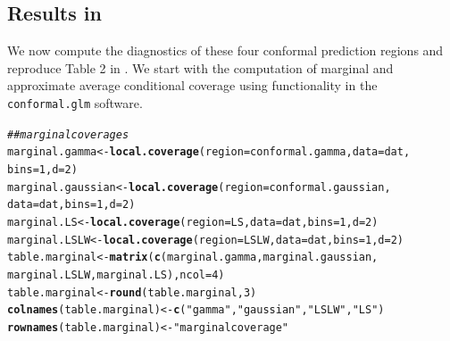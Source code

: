 \documentclass[11pt]{article}\usepackage[]{graphicx}\usepackage[]{color}
\makeatletter
\newcommand{\hlnum}[1]{\textcolor[rgb]{0.686,0.059,0.569}{#1}}%
\newcommand{\hlstr}[1]{\textcolor[rgb]{0.192,0.494,0.8}{#1}}%
\newcommand{\hlcom}[1]{\textcolor[rgb]{0.678,0.584,0.686}{\textit{#1}}}%
\newcommand{\hlstd}[1]{\textcolor[rgb]{0.345,0.345,0.345}{#1}}%
\newcommand{\hlkwb}[1]{\textcolor[rgb]{0.69,0.353,0.396}{#1}}%
\newcommand{\hlkwc}[1]{\textcolor[rgb]{0.333,0.667,0.333}{#1}}%
\newcommand{\hlkwd}[1]{\textcolor[rgb]{0.737,0.353,0.396}{\textbf{#1}}}%
\newenvironment{kframe}{%
 \def\at@end@of@kframe{}%
 \ifinner\ifhmode%
  \def\at@end@of@kframe{\end{minipage}}%
  \begin{minipage}{\columnwidth}%
 \fi\fi%
 \def\FrameCommand##1{\hskip\@totalleftmargin \hskip-\fboxsep
 \colorbox{shadecolor}{##1}\hskip-\fboxsep
     \hskip-\linewidth \hskip-\@totalleftmargin \hskip\columnwidth}%
 \MakeFramed {\advance\hsize-\width
   \@totalleftmargin\z@ \linewidth\hsize
   \@setminipage}}%
 {\par\unskip\endMakeFramed%
 \at@end@of@kframe}
\newenvironment{knitrout}{}{} %
\makeatother
\begin{document}
\subsection{Results in \citet{eck2019conformal}}

We now compute the diagnostics of these four conformal prediction 
regions and reproduce Table 2 in \citet{eck2019conformal}.  
We start with the computation of marginal and approximate average 
conditional coverage using functionality in the \texttt{conformal.glm} 
software.


\begin{knitrout}
\color{fgcolor}\begin{kframe}
\begin{alltt}
\hlcom{## marginal coverages}
\hlstd{marginal.gamma} \hlkwb{<-} \hlkwd{local.coverage}\hlstd{(}\hlkwc{region} \hlstd{= conformal.gamma,} \hlkwc{data} \hlstd{= dat,}
  \hlkwc{bins} \hlstd{=} \hlnum{1}\hlstd{,} \hlkwc{d} \hlstd{=} \hlnum{2}\hlstd{)}
\hlstd{marginal.gaussian} \hlkwb{<-} \hlkwd{local.coverage}\hlstd{(}\hlkwc{region} \hlstd{= conformal.gaussian,}
  \hlkwc{data} \hlstd{= dat,} \hlkwc{bins} \hlstd{=} \hlnum{1}\hlstd{,} \hlkwc{d} \hlstd{=} \hlnum{2}\hlstd{)}
\hlstd{marginal.LS} \hlkwb{<-} \hlkwd{local.coverage}\hlstd{(}\hlkwc{region} \hlstd{= LS,} \hlkwc{data} \hlstd{= dat,} \hlkwc{bins} \hlstd{=} \hlnum{1}\hlstd{,} \hlkwc{d} \hlstd{=} \hlnum{2}\hlstd{)}
\hlstd{marginal.LSLW} \hlkwb{<-} \hlkwd{local.coverage}\hlstd{(}\hlkwc{region} \hlstd{= LSLW,} \hlkwc{data} \hlstd{= dat,} \hlkwc{bins} \hlstd{=} \hlnum{1}\hlstd{,} \hlkwc{d} \hlstd{=} \hlnum{2}\hlstd{)}
\hlstd{table.marginal} \hlkwb{<-} \hlkwd{matrix}\hlstd{(}\hlkwd{c}\hlstd{(marginal.gamma, marginal.gaussian,}
  \hlstd{marginal.LSLW, marginal.LS),} \hlkwc{ncol} \hlstd{=} \hlnum{4}\hlstd{)}
\hlstd{table.marginal} \hlkwb{<-} \hlkwd{round}\hlstd{(table.marginal,} \hlnum{3}\hlstd{)}
\hlkwd{colnames}\hlstd{(table.marginal)} \hlkwb{<-} \hlkwd{c}\hlstd{(}\hlstr{"gamma"}\hlstd{,} \hlstr{"gaussian"}\hlstd{,} \hlstr{"LSLW"}\hlstd{,} \hlstr{"LS"}\hlstd{)}
\hlkwd{rownames}\hlstd{(table.marginal)} \hlkwb{<-} \hlstr{"marginal coverage"}


\end{alltt}
\end{kframe}
\end{knitrout}
\end{document}
